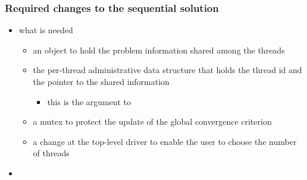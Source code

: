 \begin{frame}[fragile]
%
  \frametitle{Required changes to the sequential solution}
%
  \begin{itemize}
%
  \item what is needed
    \begin{itemize}
    \item an object to hold the problem information shared among the threads
    \item the per-thread administrative data structure that holds the thread id and the pointer
      to the shared information
      \begin{itemize}
      \item this is the argument to 
      \end{itemize}
    \item a mutex to protect the update of the global convergence criterion
    \item a change at the top-level driver to enable the user to choose the number of threads
    \end{itemize}
%
  \item
%
  \end{itemize}
%
\end{frame}

